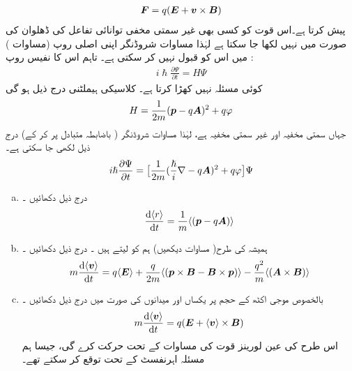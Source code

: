  \begin{align}
    {\ensuremath{{\boldsymbol{F}}}}=q({{\boldsymbol{E}}}+{{\boldsymbol{v}}}\times{\ensuremath{{\boldsymbol{B}}}})
\end{align}
 پیش کرتا ہے۔اس قوت کو کسی بھی غیر سمتی مخفی توانائی تفاعل کی ڈھلوان کی صورت میں نہیں  لکھا جا سکتا ہے لہٰذا مساوات شروڈنگر اپنی اصلی روپ (مساوات  )   میں اس کو قبول نہیں کر سکتی ہے۔ تاہم اس کا نفیس روپ :
\begin{align}
    i\hslash\frac{\partial\Psi}{\partial t}=H\Psi
\end{align}
کوئی مسئلہ نہیں کھڑا کرتا ہے۔ کلاسیکی ہیملٹنی درج ذیل ہو گی
\begin{align}
    H=\frac{1}{2m}({{\boldsymbol{p}}}-q{{\boldsymbol{A}}})^2+q\varphi
\end{align}
 جہاں   سمتی مخفیہ   اور
   غیر سمتی مخفیہ   ہے،  لہٰذا مساوات شروڈنگر 
  (   باضابطہ متبادل   پر کر کے) درج ذیل لکھی جا سکتی ہے۔
\begin{align}\label{مساوات_تین_ابعادی_شروڈنگر_باضابطہ}
    i\hslash\frac{\partial\Psi}{\partial t}=\big [\frac{1}{2m}(\frac{\hslash}{i}\nabla-q{{\boldsymbol{A}}})^2+q\varphi\big ]\Psi
\end{align}
\begin{enumerate}[a.]
\item 
درج ذیل دکھائیں ۔
  \begin{align}\label{مساوات_تین_ابعاد_رفتار_توقعاتی_تعلق}
    \frac{\dif\, \langle r \rangle }{\dif t}=\frac{1}{m}\langle(\kvec{p}-q\kvec{A})\rangle
\end{align}
\item
 ہمیشہ کی طرح( مساوات  دیکھیں)  ہم    کو  لیتے ہیں ۔ درج ذیل دکھائیں ۔
\begin{align}
    m\frac{\dif \, \langle \kvec{v} \rangle}{\dif t}=q\langle\kvec{E}\rangle+\frac{q}{2m}\langle(\kvec{p}\times\kvec{B}-\kvec{B}\times\kvec{p})\rangle-\frac{q^2}{m} \langle (\kvec{A}\times\kvec{B})\rangle
\end{align}
\item 
   بالخصوص موجی اکٹھ کے حجم پر یکساں  اور  میدانوں کی صورت میں درج ذیل دکھائیں ۔
  \begin{align}
    m\frac{\dif\, \langle \kvec{v}\rangle}{\dif t}=q(\kvec{E}+\langle\kvec{v}\rangle\times\kvec{B})
\end{align}
  اس طرح  کی عین لورینز قوت کی مساوات کے تحت حرکت کرے گی، جیسا ہم مسئلہ اہرنفسٹ  کے تحت توقع  کر سکتے تھے۔
\end{enumerate}
